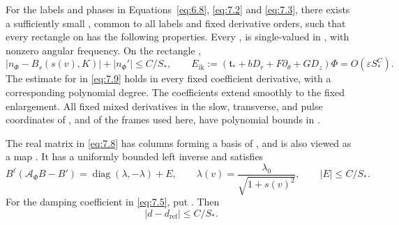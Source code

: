 \begin{lemma}\label{lem:7.1}
For the labels and phases in Equations~\eqref{eq:6.8}, \eqref{eq:7.2} and \eqref{eq:7.3}, there exists a sufficiently
small , common to all labels and fixed derivative orders, such that every rectangle on 
has the following properties. Every , is single-valued in , with nonzero angular
frequency. On the rectangle ,
\begin{equation}
|n_\Phi-B_s(s(v),K)|+|n_\Phi'|\leq C/S_*,
\qquad
E_{\mathrm{ik}}:=(\mathfrak t_*+bD_r+F\partial_\theta+GD_z)\Phi=O(\varepsilon S_*^C).
\tag{7.9}\label{eq:7.9}
\end{equation}
The estimate for  in \eqref{eq:7.9} holds in every fixed coefficient derivative, with a corresponding polynomial
degree. The coefficients extend smoothly to the fixed enlargement. All fixed mixed derivatives in the
slow, transverse, and pulse coordinates of , and of the frames used here, have polynomial bounds in
.

The real  matrix  in \eqref{eq:7.8} has columns forming a basis of , and is also viewed as a map
. It has a uniformly bounded left inverse  and satisfies
\begin{equation}
B^\ell(\mathcal A_\Phi B-B')=\operatorname{diag}(\lambda,-\lambda)+E,
\qquad
\lambda(v)=\frac{\lambda_0}{\sqrt{1+s(v)^2}},
\qquad
|E|\leq C/S_*.
\tag{7.10}\label{eq:7.10}
\end{equation}
For the damping coefficient  in \eqref{eq:7.5}, put . Then
\begin{equation}
|d-d_{\mathrm{ref}}|\leq C/S_*.
\tag{7.11}\label{eq:7.11}
\end{equation}
\end{lemma}

